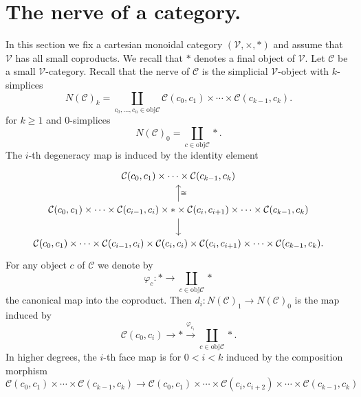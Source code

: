 \section{The nerve of a category.}
In this section we fix a cartesian monoidal category
$(\mathcal{V},\times,\ast)$ and assume that $\mathcal{V}$ has all
small coproducts. We recall that $\ast $ denotes a final object of $\mathcal{V}$.
Let $\mathcal{C}$ be a small $\mathcal{V}$-category. Recall that the nerve of $\mathcal{C}$
is the simplicial $\mathcal{V}$-object with 
$k$-simplices
\begin{equation}\label{eq:nervesimplices}
N(\mathcal{C})_k = 
\coprod_{c_0,\ldots, c_n\in \mathrm{ obj } \mathcal{C}}
\mathcal{C}(c_0,c_1)\times \cdots \times \mathcal{C}(c_{k-1}, c_k).
\end{equation}
for $k\ge 1$ and $0$-simplices
\begin{equation}\label{eq:nervezerosimplices}
N(\mathcal{C})_0 = 
\coprod_{c\in \mathrm{ obj } \mathcal{C}}
\ast.
\end{equation}
The $i$-th degeneracy map is induced by the identity element
\begin{equation*}\begin{tikzcd}
\mathcal{C}(c_0,c_1)\times \cdots \times \mathcal{C}(c_{k-1}, c_k)\\
 \mathcal{C}(c_0,c_1)\times \cdots \times \mathcal{C}(c_{i-1}, c_i) \times \ast
\times \mathcal{C}(c_{i}, c_{i+1})\times
\cdots \times \mathcal{C}(c_{k-1}, c_k)
\arrow[swap]{u}{\cong}\arrow{d}\\
\mathcal{C}(c_0,c_1)\times \cdots \times \mathcal{C}(c_{i-1}, c_i) \times \mathcal{C}(c_{i}, c_i)
\times \mathcal{C}(c_{i}, c_{i+1})\times
\cdots \times \mathcal{C}(c_{k-1}, c_k).
\end{tikzcd}
\end{equation*}
For any object $c$ of $\mathcal{C}$ we denote by 
\[
\varphi_c:\ast\to \coprod_{c\in \mathrm{ obj } \mathcal{C}}\ast
\]
the canonical map into the coproduct. Then
$d_i:N(\mathcal{C})_1\to N(\mathcal{C})_0$
is the map induced by
\[
\mathcal{C}(c_0,c_i)\to \ast\xrightarrow{\varphi_{c_i}} \coprod_{c\in \mathrm{ obj } \mathcal{C}}\ast.
\]
In higher degrees,  the $i$-th face map is for $0<i<k$ induced by the composition morphism
\begin{equation*}
\mathcal{C}(c_0,c_1)\times \cdots \times \mathcal{C}(c_{k-1}, c_k)\to 
\mathcal{C}(c_0,c_1)\times \cdots\times
\mathcal{C}(c_{i}, c_{i+2})\times 
 \cdots \times \mathcal{C}(c_{k-1}, c_k)
\end{equation*}
